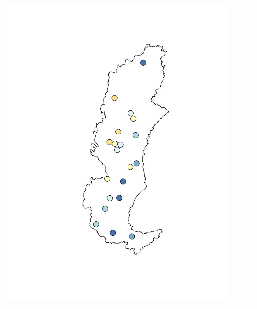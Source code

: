 \begin{landscape}
\begin{tabular}{c c c l}
		\includegraphics[trim= 4cm 2cm 1cm 2cm, clip, scale = 0.35]{./img/nashsut_harg} &

\end{tabular}
\end{landscape}
